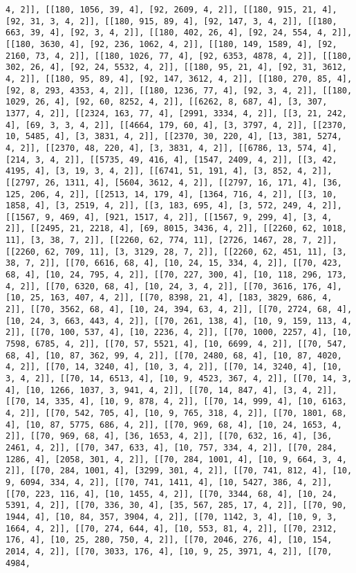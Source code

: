 \documentclass[12pt,fleqn]{article}\usepackage{../../common}
\begin{document}
\begin{verbatim}
4, 2]], [[180, 1056, 39, 4], [92, 2609, 4, 2]], [[180, 915, 21, 4], [92, 31, 3, 4, 2]], [[180, 915, 89, 4], [92, 147, 3, 4, 2]], [[180, 663, 39, 4], [92, 3, 4, 2]], [[180, 402, 26, 4], [92, 24, 554, 4, 2]], [[180, 3630, 4], [92, 236, 1062, 4, 2]], [[180, 149, 1589, 4], [92, 2160, 73, 4, 2]], [[180, 1026, 77, 4], [92, 6353, 4878, 4, 2]], [[180, 302, 26, 4], [92, 24, 5532, 4, 2]], [[180, 95, 21, 4], [92, 31, 3612, 4, 2]], [[180, 95, 89, 4], [92, 147, 3612, 4, 2]], [[180, 270, 85, 4], [92, 8, 293, 4353, 4, 2]], [[180, 1236, 77, 4], [92, 3, 4, 2]], [[180, 1029, 26, 4], [92, 60, 8252, 4, 2]], [[6262, 8, 687, 4], [3, 307, 1377, 4, 2]], [[2324, 163, 77, 4], [2991, 3334, 4, 2]], [[3, 21, 242, 4], [69, 3, 3, 4, 2]], [[4664, 179, 60, 4], [3, 3797, 4, 2]], [[2370, 10, 5485, 4], [3, 3831, 4, 2]], [[2370, 30, 220, 4], [13, 381, 5274, 4, 2]], [[2370, 48, 220, 4], [3, 3831, 4, 2]], [[6786, 13, 574, 4], [214, 3, 4, 2]], [[5735, 49, 416, 4], [1547, 2409, 4, 2]], [[3, 42, 4195, 4], [3, 19, 3, 4, 2]], [[6741, 51, 191, 4], [3, 852, 4, 2]], [[2797, 26, 1311, 4], [5604, 3612, 4, 2]], [[2797, 16, 171, 4], [36, 125, 206, 4, 2]], [[2513, 14, 179, 4], [1364, 716, 4, 2]], [[3, 10, 1858, 4], [3, 2519, 4, 2]], [[3, 183, 695, 4], [3, 572, 249, 4, 2]], [[1567, 9, 469, 4], [921, 1517, 4, 2]], [[1567, 9, 299, 4], [3, 4, 2]], [[2495, 21, 2218, 4], [69, 8015, 3436, 4, 2]], [[2260, 62, 1018, 11], [3, 38, 7, 2]], [[2260, 62, 774, 11], [2726, 1467, 28, 7, 2]], [[2260, 62, 709, 11], [3, 3129, 28, 7, 2]], [[2260, 62, 451, 11], [3, 38, 7, 2]], [[70, 6616, 68, 4], [10, 24, 15, 334, 4, 2]], [[70, 423, 68, 4], [10, 24, 795, 4, 2]], [[70, 227, 300, 4], [10, 118, 296, 173, 4, 2]], [[70, 6320, 68, 4], [10, 24, 3, 4, 2]], [[70, 3616, 176, 4], [10, 25, 163, 407, 4, 2]], [[70, 8398, 21, 4], [183, 3829, 686, 4, 2]], [[70, 3562, 68, 4], [10, 24, 394, 63, 4, 2]], [[70, 2724, 68, 4], [10, 24, 3, 663, 443, 4, 2]], [[70, 261, 138, 4], [10, 9, 159, 113, 4, 2]], [[70, 100, 537, 4], [10, 2236, 4, 2]], [[70, 1000, 2257, 4], [10, 7598, 6785, 4, 2]], [[70, 57, 5521, 4], [10, 6699, 4, 2]], [[70, 547, 68, 4], [10, 87, 362, 99, 4, 2]], [[70, 2480, 68, 4], [10, 87, 4020, 4, 2]], [[70, 14, 3240, 4], [10, 3, 4, 2]], [[70, 14, 3240, 4], [10, 3, 4, 2]], [[70, 14, 6513, 4], [10, 9, 4523, 367, 4, 2]], [[70, 14, 3, 4], [10, 1266, 1037, 3, 941, 4, 2]], [[70, 14, 847, 4], [3, 4, 2]], [[70, 14, 335, 4], [10, 9, 878, 4, 2]], [[70, 14, 999, 4], [10, 6163, 4, 2]], [[70, 542, 705, 4], [10, 9, 765, 318, 4, 2]], [[70, 1801, 68, 4], [10, 87, 5775, 686, 4, 2]], [[70, 969, 68, 4], [10, 24, 1653, 4, 2]], [[70, 969, 68, 4], [36, 1653, 4, 2]], [[70, 632, 16, 4], [36, 2461, 4, 2]], [[70, 347, 633, 4], [10, 757, 334, 4, 2]], [[70, 284, 1286, 4], [2058, 301, 4, 2]], [[70, 284, 1001, 4], [10, 9, 664, 3, 4, 2]], [[70, 284, 1001, 4], [3299, 301, 4, 2]], [[70, 741, 812, 4], [10, 9, 6094, 334, 4, 2]], [[70, 741, 1411, 4], [10, 5427, 386, 4, 2]], [[70, 223, 116, 4], [10, 1455, 4, 2]], [[70, 3344, 68, 4], [10, 24, 5391, 4, 2]], [[70, 336, 30, 4], [35, 567, 285, 17, 4, 2]], [[70, 90, 1944, 4], [10, 84, 357, 3904, 4, 2]], [[70, 1142, 3, 4], [10, 9, 3, 1664, 4, 2]], [[70, 274, 644, 4], [10, 553, 81, 4, 2]], [[70, 2312, 176, 4], [10, 25, 280, 750, 4, 2]], [[70, 2046, 276, 4], [10, 154, 2014, 4, 2]], [[70, 3033, 176, 4], [10, 9, 25, 3971, 4, 2]], [[70, 4984, 
\end{verbatim}
\end{document}

